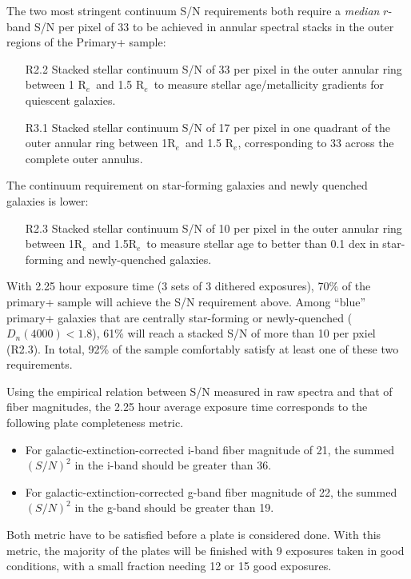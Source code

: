 \documentclass[preprint,11pt]{aastex}
\newcommand{\Reff}{{R$_{e}$}}
\begin{document}
The two most stringent continuum S/N requirements both require a {\em median} $r$-band S/N per pixel of 33 to be achieved in annular spectral stacks in the outer
regions of the Primary+ sample:

\begin{itemize}
\item [R2.2] Stacked stellar continuum S/N of 33 per pixel in the outer annular ring between 1 \Reff\ and 1.5 \Reff\ to measure stellar age/metallicity gradients for quiescent galaxies.
\item [R3.1] Stacked stellar continuum S/N of 17 per pixel in one quadrant of the outer annular ring between 1\Reff\ and 1.5 \Reff, corresponding to 33 across the complete outer annulus.
\end{itemize}

\noindent The continuum requirement on star-forming galaxies and newly quenched galaxies is lower: 
\begin{itemize}
\item[R2.3] Stacked stellar continuum S/N of 10 per pixel in the outer annular ring between 1\Reff\ and 1.5\Reff\ to measure stellar age to better than 0.1 dex in star-forming and newly-quenched galaxies. 
\end{itemize}

With 2.25 hour exposure time (3 sets of 3 dithered exposures), 70\% of the primary+ sample will achieve the S/N
requirement above. Among ``blue'' primary+ galaxies that are centrally star-forming or newly-quenched ($D_n(4000) <
1.8$), 61\% will reach a stacked S/N of more than 10 per pxiel (R2.3).  In total, 92\% of the sample comfortably
satisfy at least one of these two requirements.

Using the empirical relation between S/N measured in raw spectra and that of fiber magnitudes, the 2.25 hour average exposure time corresponds to the following plate completeness metric. 

\begin{itemize}
\item For galactic-extinction-corrected i-band fiber magnitude of 21, the summed $(S/N)^2$ in the i-band should be greater than 36.
 \item For galactic-extinction-corrected g-band fiber magnitude of 22, the summed $(S/N)^2$ in the g-band should be greater than 19.
\end{itemize}

Both metric have to be satisfied before a plate is considered done. With this metric, the majority of the plates will be finished with 9 exposures taken in good conditions, with a small fraction needing 12 or 15 good exposures. 
\end{document}
